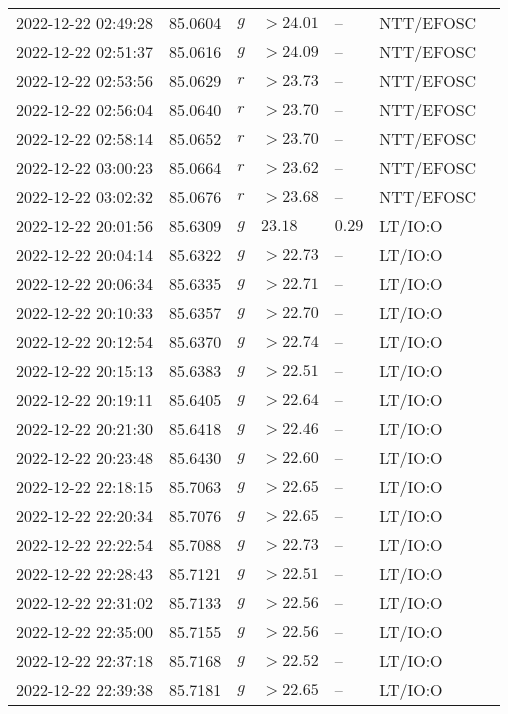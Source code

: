 \documentclass{nature_plusfigure}
\begin{document}
\begin{supplement}
\begin{center}
\begin{longtable}{lllllll}
2022-12-22 02:49:28 & 85.0604 & $g$ & $>24.01$ & -- & NTT/EFOSC &  \\ 
2022-12-22 02:51:37 & 85.0616 & $g$ & $>24.09$ & -- & NTT/EFOSC &  \\ 
2022-12-22 02:53:56 & 85.0629 & $r$ & $>23.73$ & -- & NTT/EFOSC &  \\ 
2022-12-22 02:56:04 & 85.0640 & $r$ & $>23.70$ & -- & NTT/EFOSC &  \\ 
2022-12-22 02:58:14 & 85.0652 & $r$ & $>23.70$ & -- & NTT/EFOSC &  \\ 
2022-12-22 03:00:23 & 85.0664 & $r$ & $>23.62$ & -- & NTT/EFOSC &  \\ 
2022-12-22 03:02:32 & 85.0676 & $r$ & $>23.68$ & -- & NTT/EFOSC &  \\ 
2022-12-22 20:01:56 & 85.6309 & $g$ & $23.18$ & $0.29$ & LT/IO:O &  \\ 
2022-12-22 20:04:14 & 85.6322 & $g$ & $>22.73$ & -- & LT/IO:O &  \\ 
2022-12-22 20:06:34 & 85.6335 & $g$ & $>22.71$ & -- & LT/IO:O &  \\ 
2022-12-22 20:10:33 & 85.6357 & $g$ & $>22.70$ & -- & LT/IO:O &  \\ 
2022-12-22 20:12:54 & 85.6370 & $g$ & $>22.74$ & -- & LT/IO:O &  \\ 
2022-12-22 20:15:13 & 85.6383 & $g$ & $>22.51$ & -- & LT/IO:O &  \\ 
2022-12-22 20:19:11 & 85.6405 & $g$ & $>22.64$ & -- & LT/IO:O &  \\ 
2022-12-22 20:21:30 & 85.6418 & $g$ & $>22.46$ & -- & LT/IO:O &  \\ 
2022-12-22 20:23:48 & 85.6430 & $g$ & $>22.60$ & -- & LT/IO:O &  \\ 
2022-12-22 22:18:15 & 85.7063 & $g$ & $>22.65$ & -- & LT/IO:O &  \\ 
2022-12-22 22:20:34 & 85.7076 & $g$ & $>22.65$ & -- & LT/IO:O &  \\ 
2022-12-22 22:22:54 & 85.7088 & $g$ & $>22.73$ & -- & LT/IO:O &  \\ 
2022-12-22 22:28:43 & 85.7121 & $g$ & $>22.51$ & -- & LT/IO:O &  \\ 
2022-12-22 22:31:02 & 85.7133 & $g$ & $>22.56$ & -- & LT/IO:O &  \\ 
2022-12-22 22:35:00 & 85.7155 & $g$ & $>22.56$ & -- & LT/IO:O &  \\ 
2022-12-22 22:37:18 & 85.7168 & $g$ & $>22.52$ & -- & LT/IO:O &  \\ 
2022-12-22 22:39:38 & 85.7181 & $g$ & $>22.65$ & -- & LT/IO:O &  \\ 

\end{longtable}
\end{center}
\end{supplement}
\end{document}
